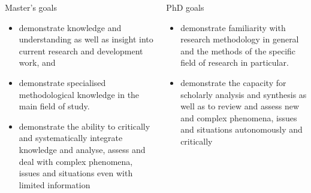\begin{frame}[fragile]
  \footnotesize
  \begin{columns}[t]
    \begin{column}{0.5\columnwidth}
      \begin{block}{Master's goals~\cite{HEO2}}
        \begin{itemize}
          \item demonstrate knowledge and understanding \textelp{} as well as 
            insight into current research and development work, and
          \item demonstrate specialised methodological knowledge in the main 
            field of study.
          \item demonstrate the ability to critically and systematically 
            integrate knowledge and analyse, assess and deal with complex 
            phenomena, issues and situations even with limited information
        \end{itemize}
      \end{block}
    \end{column}
    \begin{column}{0.5\columnwidth}
      \begin{block}{PhD goals~\cite{HEO2}}
        \begin{itemize}
          \item demonstrate familiarity with research methodology in general 
            and the methods of the specific field of research in particular.
          \item demonstrate the capacity for scholarly analysis and synthesis as 
            well as to review and assess new and complex phenomena, issues and 
            situations autonomously and critically
        \end{itemize}
      \end{block}
    \end{column}
  \end{columns}
\end{frame}

